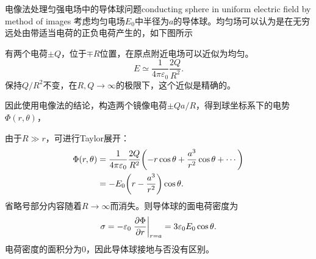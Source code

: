 \begin{example}{电像法处理匀强电场中的导体球问题}{conducting sphere in uniform electric field by method of images}
    考虑均匀电场$E_0$中半径为$a$的导体球。均匀场可以认为是在无穷远处由带适当电荷的正负电荷产生的，如下图所示
    \begin{center}
    \end{center}
    有两个电荷$\pm Q$，位于$\mp R$位置，在原点附近电场可以近似为均匀。
    \[
        E\simeq\frac1{4\pi\varepsilon_0}\frac{2Q}{R^2}.
    \]
    保持$Q/R^2$不变，在$R,Q\to\infty$的极限下，这个近似是精确的。

    因此使用电像法的结论，构造两个镜像电荷$\pm Qa/R$，得到球坐标系下的电势$\Phi(r,\theta)$，

    由于$R\gg r$，可进行Taylor展开：
    \begin{align}
        \notag
        \Phi(r,\theta)&=\frac1{4\pi\varepsilon_0}\frac{2Q}{R^2}\biggl(-r\cos\theta+\frac{a^3}{r^2}\cos\theta+\cdots\biggr)\\
        &=-E_0\biggl(r-\frac{a^3}{r^2}\biggr)\cos\theta.
    \end{align}
    省略号部分内容随着$R\to\infty$而消失。则导体球的面电荷密度为
    \begin{equation}
        \sigma=-\varepsilon_0\left.\frac{\partial^{\;\!\!}\Phi}{\partial r^{\;\!\!}}\right\rvert_{r=a}=3\varepsilon_0E_0\cos\theta.
    \end{equation}
    电荷密度的面积分为0，因此导体球接地与否没有区别。
\end{example}
